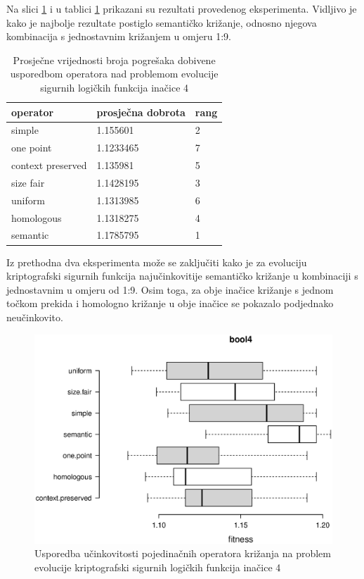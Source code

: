 Na slici \ref{bool4box} i u tablici \ref{bool4table} prikazani su rezultati provedenog eksperimenta. Vidljivo je kako je najbolje rezultate postiglo semantičko križanje, odnosno njegova kombinacija s jednostavnim križanjem u omjeru 1:9.

\begin{table}[H]
 	\centering
 \caption{Prosječne vrijednosti broja pogrešaka dobivene usporedbom operatora nad problemom evolucije sigurnih logičkih funkcija inačice 4}
    \begin{tabular}{| l | l | l |}
    \hline
    \textbf{operator} & \textbf{prosječna dobrota} & \textbf{rang}\\ \hline
    simple & 1.155601 & 2\\ \hline
    one point & 1.1233465 & 7\\ \hline
    context preserved & 1.135981 & 5\\ \hline
    size fair & 1.1428195 & 3\\ \hline
    uniform & 1.1313985 & 6\\ \hline
    homologous & 1.1318275 & 4\\ \hline
    semantic & 1.1785795 & 1\\ \hline
    \end{tabular}
    
   
    \label{bool4table}
\end{table}


Iz prethodna dva eksperimenta može se zaključiti kako je za evoluciju kriptografski sigurnih funkcija najučinkovitije semantičko križanje u kombinaciji s jednostavnim u omjeru od 1:9. Osim toga, za obje inačice križanje s jednom točkom prekida i homologno križanje u obje inačice se pokazalo podjednako neučinkovito.

\begin{figure}[H]
	\centering
	\includegraphics[trim=0cm 4cm 0cm 0cm, scale=0.6]{./slike/boxPlots/bool4.eps}
	\caption{Usporedba učinkovitosti pojedinačnih operatora križanja na problem evolucije kriptografski sigurnih logičkih funkcija inačice 4}
	\label{bool4box}
\end{figure}


